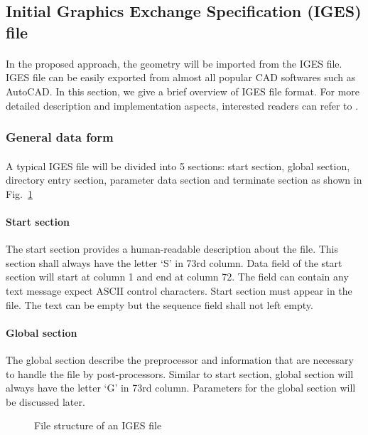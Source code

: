 \subsection{Initial Graphics Exchange Specification (IGES) file}
\paragraph{}
In the proposed approach, the geometry will be imported from the IGES file.
IGES file can be easily exported from almost all popular CAD softwares such as AutoCAD.
In this section, we give a brief overview of IGES file format.
For more detailed description and implementation aspects, interested readers can refer to \cite{uspro2006}.

\subsubsection{General data form}
\paragraph{}
A typical IGES file will be divided into 5 sections: start section, global section, directory entry section, parameter data section and terminate section as shown in Fig.~\ref{lr_fig:iges_data_form}

\paragraph{Start section}
The start section provides a human-readable description about the file.
This section shall always have the letter `S' in 73rd column.
Data field of the start section will start at column 1 and end at column 72.
The field can contain any text message expect ASCII control characters.
Start section must appear in the file.
The text can be empty but the sequence field shall not left empty.

\paragraph{Global section}
The global section describe the preprocessor and information that are necessary to handle the file by post-processors.
Similar to start section, global section will always have the letter `G' in 73rd column.
Parameters for the global section will be discussed later.

\begin{figure}[!ht]
    \centering
    \caption{File structure of an IGES file}
    \label{lr_fig:iges_data_form}
\end{figure}